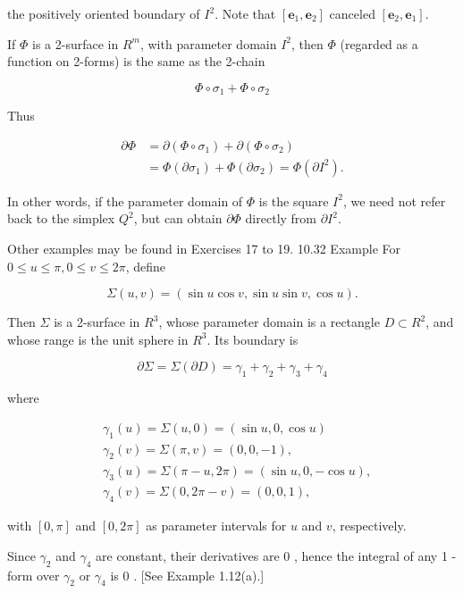 \documentclass[10pt]{article}
\begin{document}
the positively oriented boundary of $I^{2}$. Note that $\left[\mathbf{e}_{1}, \mathbf{e}_{2}\right]$ canceled $\left[\mathbf{e}_{2}, \mathbf{e}_{1}\right]$.

If $\Phi$ is a 2-surface in $R^{m}$, with parameter domain $I^{2}$, then $\Phi$ (regarded as a function on 2-forms) is the same as the 2-chain

$$
\Phi \circ \sigma_{1}+\Phi \circ \sigma_{2}
$$

Thus

$$
\begin{aligned}
\partial \Phi & =\partial\left(\Phi \circ \sigma_{1}\right)+\partial\left(\Phi \circ \sigma_{2}\right) \\
& =\Phi\left(\partial \sigma_{1}\right)+\Phi\left(\partial \sigma_{2}\right)=\Phi\left(\partial I^{2}\right) .
\end{aligned}
$$

In other words, if the parameter domain of $\Phi$ is the square $I^{2}$, we need not refer back to the simplex $Q^{2}$, but can obtain $\partial \Phi$ directly from $\partial I^{2}$.

Other examples may be found in Exercises 17 to 19. 10.32 Example For $0 \leq u \leq \pi, 0 \leq v \leq 2 \pi$, define

$$
\Sigma(u, v)=(\sin u \cos v, \sin u \sin v, \cos u) .
$$

Then $\Sigma$ is a 2-surface in $R^{3}$, whose parameter domain is a rectangle $D \subset R^{2}$, and whose range is the unit sphere in $R^{3}$. Its boundary is

$$
\partial \Sigma=\Sigma(\partial D)=\gamma_{1}+\gamma_{2}+\gamma_{3}+\gamma_{4}
$$

where

$$
\begin{aligned}
& \gamma_{1}(u)=\Sigma(u, 0)=(\sin u, 0, \cos u) \\
& \gamma_{2}(v)=\Sigma(\pi, v)=(0,0,-1), \\
& \gamma_{3}(u)=\Sigma(\pi-u, 2 \pi)=(\sin u, 0,-\cos u), \\
& \gamma_{4}(v)=\Sigma(0,2 \pi-v)=(0,0,1),
\end{aligned}
$$

with $[0, \pi]$ and $[0,2 \pi]$ as parameter intervals for $u$ and $v$, respectively.

Since $\gamma_{2}$ and $\gamma_{4}$ are constant, their derivatives are 0 , hence the integral of any 1 -form over $\gamma_{2}$ or $\gamma_{4}$ is 0 . [See Example 1.12(a).]
\end{document}
